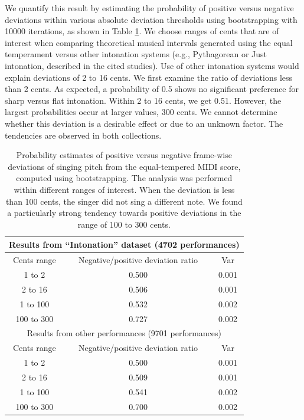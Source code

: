We quantify this result by estimating the probability of positive versus negative deviations within various absolute deviation thresholds using bootstrapping \cite{efron1994introduction} with 10000 iterations, as shown in Table \ref{table:1}. We choose ranges of cents that are of interest when comparing theoretical musical intervals generated using the equal temperament versus other intonation systems (e.g., Pythagorean or Just intonation, described in the cited studies). Use of other intonation systems would explain deviations of 2 to 16 cents. We first examine the ratio of deviations less than 2 cents. As expected, a probability of 0.5 shows no significant preference for sharp versus flat intonation. Within 2 to 16 cents, we get 0.51. However, the largest probabilities occur at larger values, 300 cents. We cannot determine whether this deviation is a desirable effect or due to an unknown factor. The tendencies are observed in both collections. 


\begin{table}[t!]
\centering
\begin{tabular}{ |c|c|c| } 
\hline
\multicolumn{3}{|c|}{Results from ``Intonation'' dataset (4702 performances)}\\
\hline\hline
Cents range & Negative/positive deviation ratio & Var \\
\hline
1 to 2 & 0.500 & 0.001 \\ 
2 to 16 & 0.506 & 0.001 \\ 
1 to 100 & 0.532 & 0.002\\ 
100 to 300 & 0.727 & 0.002\\ 
\hline\hline
\multicolumn{3}{|c|}{Results from other performances (9701 performances)}\\
\hline\hline
Cents range & Negative/positive deviation ratio & Var \\
\hline
1 to 2 & 0.500 & 0.001 \\ 
2 to 16 & 0.509 & 0.001 \\ 
1 to 100 & 0.541 & 0.002\\ 
100 to 300 & 0.700 & 0.002\\ 
\hline
\end{tabular}
\caption{Probability estimates of positive versus negative frame-wise deviations of singing pitch from the equal-tempered MIDI score, computed using bootstrapping. The analysis was performed within different ranges of interest. When the deviation is less than 100 cents, the singer did not sing a different note. We found a particularly strong tendency towards positive deviations in the range of 100 to 300 cents.}
\label{table:1}
\end{table}

